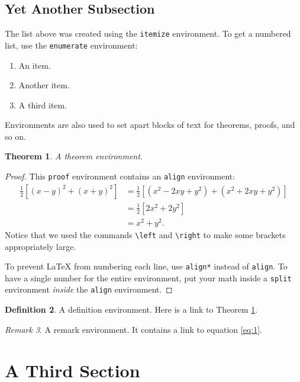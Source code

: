 \documentclass[a4paper,10pt,leqno]{article}
\numberwithin{equation}{section}
\theoremstyle{plain}
\newtheorem{thm}{Theorem}[section]
\theoremstyle{definition}
\newtheorem{df}[thm]{Definition}
\theoremstyle{remark}
\newtheorem{rem}[thm]{Remark}
\begin{document}
\subsection{Yet Another Subsection} 

The list above was created using the \texttt{itemize} environment.
To get a numbered list, use the \texttt{enumerate} environment:
\begin{enumerate}
\item 	An item.

\item 	Another item.

\item 	A third item.

\end{enumerate}
Environments are also used to set apart blocks of text for theorems, proofs, and so on.

\begin{thm}\label{thm:1}
A theorem environment.
\end{thm}

\begin{proof}
This \texttt{proof} environment contains an \texttt{align} environment:
\begin{align}
\frac{1}{2} \left[(x - y)^2 + (x + y)^2 \right]
	&= \frac{1}{2} \left[(x^2 - 2xy + y^2) + (x^2 + 2xy + y^2) \right]\\
	&= \frac{1}{2} [2x^2 + 2y^2]\\
	&= x^2 + y^2.
\end{align}
Notice that we used the commands \texttt{\textbackslash{}left} and \texttt{\textbackslash{}right} to make some brackets appropriately large.

To prevent \LaTeX{} from numbering each line, use \texttt{align*} instead of \texttt{align}.
To have a single number for the entire environment, put your math inside a \texttt{split} environment \emph{inside} the \texttt{align} environment.
\end{proof}

\begin{df}
A definition environment.
Here is a link to Theorem \ref{thm:1}.
\end{df}

\begin{rem}
A remark environment.
It contains a link to equation \eqref{eq:1}.
\end{rem}

\section{A Third Section}
\end{document}
